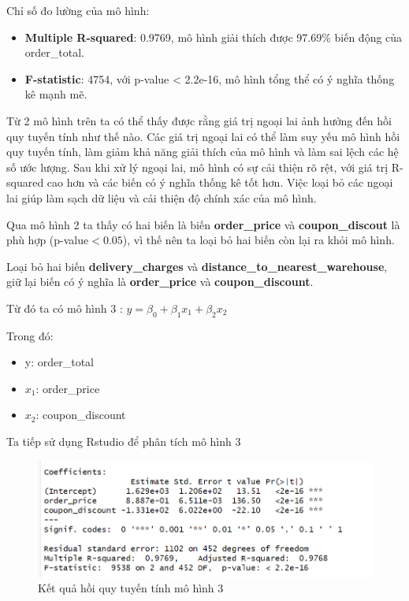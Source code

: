 Chỉ số đo lường của mô hình:

\begin{itemize}
\item\textbf{Multiple R-squared}: 0.9769, mô hình giải thích được 97.69\% biến động của order\_total.
\item\textbf{F-statistic}: 4754, với p-value < 2.2e-16, mô hình tổng thể có ý nghĩa thống kê mạnh mẽ.
\end{itemize}

Từ 2 mô hình trên ta có thể thấy được rằng giá trị ngoại lai ảnh hưởng đến hồi quy tuyến tính như thế nào. Các giá trị ngoại lai có thể làm suy yếu mô hình hồi quy tuyến tính, làm giảm khả năng giải thích của mô hình và làm sai lệch các hệ số ước lượng. Sau khi xử lý ngoại lai, mô hình có sự cải thiện rõ rệt, với giá trị R-squared cao hơn và các biến có ý nghĩa thống kê tốt hơn. Việc loại bỏ các ngoại lai giúp làm sạch dữ liệu và cải thiện độ chính xác của mô hình.

Qua mô hình 2 ta thấy có hai biến là biến \textbf{order\_price} và \textbf{coupon\_discout} là phù hợp (p-value$<0.05$), vì thế nên ta loại bỏ hai biến còn lại ra khỏi mô hình.

Loại bỏ hai biến \textbf{delivery\_charges} và \textbf{distance\_to\_nearest\_warehouse}, giữ lại biến có ý nghĩa là \textbf{order\_price} và \textbf{coupon\_discount}.

Từ đó ta có mô hình 3 : $y= \beta_0 + \beta_1x_1 + \beta_2x_2$ 

Trong đó:
\begin{itemize}
  \item y: order\_total
  \item $x_1$: order\_price
  \item $x_2$: coupon\_discount
\end{itemize}

Ta tiếp sử dụng Rstudio để phân tích mô hình 3
\begin{figure}[H]
  \centering
  \includegraphics[width=0.7\linewidth]{graphics/5.5.4.png}
  \caption{Kết quả hồi quy tuyến tính mô hình 3 }
  \label{m4}
\end{figure}


